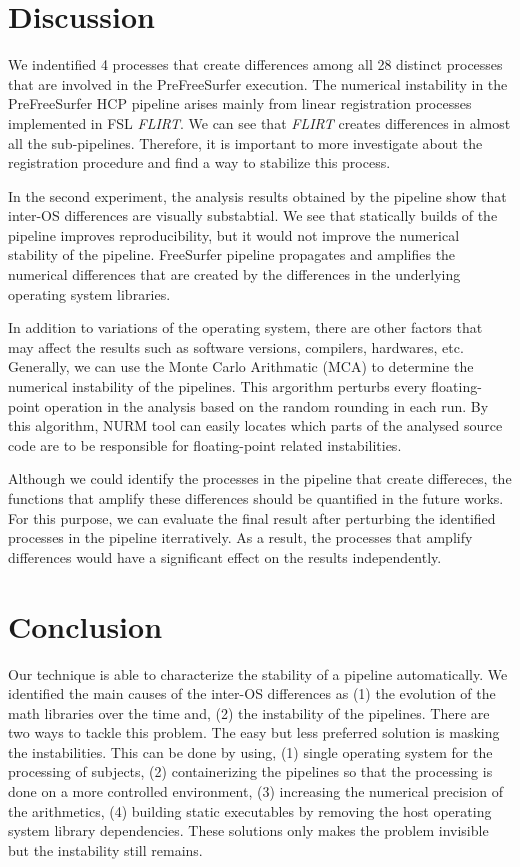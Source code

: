\documentclass[a4paper,num-refs]{oup-contemporary}
\begin{document}
\section{Discussion}

We indentified 4 processes that create differences 
among all 28 distinct processes that are involved in the PreFreeSurfer execution. 
The numerical instability in the 
PreFreeSurfer HCP pipeline arises mainly from linear 
registration processes implemented in FSL \emph{FLIRT}. 
We can see that \emph{FLIRT} creates differences in almost all the sub-pipelines. 
Therefore, it is important to more investigate about the registration procedure and find 
a way to stabilize this process. 

In the second experiment, 
the analysis results obtained by the pipeline show that inter-OS differences are visually substabtial.
We see that statically builds of the pipeline improves reproducibility, but 
it would not improve the numerical stability of the pipeline. 
FreeSurfer pipeline propagates and amplifies the numerical differences that are created by the 
differences in the underlying operating system libraries.

In addition to variations of the operating system, there are other factors that may affect 
the results such as software versions, compilers, hardwares, etc.
Generally, we can use the Monte Carlo Arithmatic (MCA) to determine the numerical instability of the pipelines.
This argorithm perturbs every floating-point operation 
in the analysis based on the random rounding in each run. 
By this algorithm, NURM tool can easily locates which parts of the analysed source code are to be responsible 
for floating-point related instabilities.

Although we could identify the processes in the pipeline that create differeces, the functions 
that amplify these differences should be quantified in the future works.
For this purpose, we can evaluate the final result after perturbing the identified processes in the pipeline iterratively.
As a result, the processes that amplify differences would have a significant effect on the results independently.


\section{Conclusion}

Our technique is able to characterize the stability of a pipeline
automatically. We identified the main causes of the inter-OS differences as (1) the evolution 
of the math libraries over the time and, (2) the instability of the pipelines. 
There are two ways to tackle this problem. The easy but less preferred solution is masking the instabilities.
This can be done by using, (1) single operating system for the processing of subjects, 
(2) containerizing the pipelines so that the 
processing is done on a more controlled environment, 
(3) increasing the numerical precision of the arithmetics, 
(4) building static executables by removing the host operating system library dependencies. 
These solutions only makes the problem invisible but the instability still remains.
\end{document}
